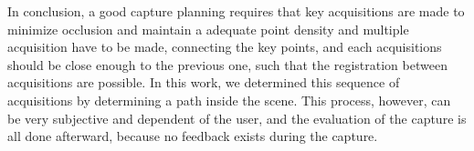 In conclusion, a good capture planning requires that key acquisitions are made to minimize occlusion and maintain a adequate point density and multiple acquisition have to be made, connecting the key points, and each acquisitions should be close enough to the previous one, such that the registration between acquisitions are possible. In this work, we determined this sequence of acquisitions by determining a path inside the scene. This process, however, can be very subjective and dependent of the user, and the evaluation of the capture is all done afterward, because no feedback exists during the capture. 

